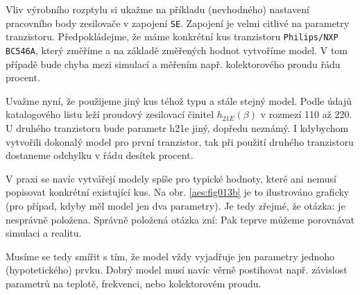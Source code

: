         \begin{mdframed}[style=mdnote]
          \begin{note}
            Vliv výrobního rozptylu si ukažme na příkladu (nevhodného) nastavení pracovního body
            zesilovače v zapojení \texttt{SE}. Zapojení je velmi citlivé na parametry tranzistoru.
            Předpokládejme, že máme konkrétní kus tranzistoru \texttt{Philips/NXP BC546A}, který
            změříme a na základě změřených hodnot vytvoříme model. V tom případě bude chyba mezi
            simulací a měřením např. kolektorového proudu řádu procent.
            
            {\centering
            \captionsetup{type=figure}
              \hspace{1em} 
           \par}

          Uvažme nyní, že použijeme jiný kus téhož typu a stále stejný model. Podle údajů
          katalogového listu leží proudový zesilovací činitel \(h_{21E}(\beta)\) v rozmezí \num{110}
          až \num{220}. U druhého tranzistoru bude parametr h21e jiný, dopředu neznámý. I kdybychom
          vytvořili dokonalý model pro první tranzistor, tak při použití druhého tranzistoru
          dostaneme odchylku v řádu desítek procent.

          V praxi se navíc vytvářejí modely spíše pro typické hodnoty, které ani nemusí popisovat
          konkrétní existující kus. Na obr. \ref{aes:fig013b}  je to ilustrováno graficky (pro
          případ, kdyby měl model jen dva parametry). Je tedy zřejmé, že otázka:  je nesprávně položena. Správně položená otázka zní:  Pak teprve můžeme porovnávat simulaci a realitu.

          Musíme se tedy smířit s tím, že model vždy vyjadřuje jen parametry jednoho (hypotetického)
          prvku. Dobrý model musí navíc věrně postihovat např. závislost parametrů na teplotě,
          frekvenci, nebo kolektorovém proudu.
        \end{note} 
      \end{mdframed} 

